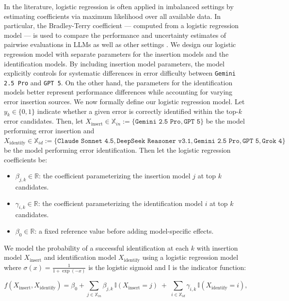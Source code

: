 \documentclass{article}
\newcommand{\gemini}{\texttt{Gemini 2.5 Pro}}
\newcommand{\gpt}{\texttt{GPT 5}}
\newcommand{\grok}{\texttt{Grok 4}}
\newcommand{\deepseek}{\texttt{DeepSeek Reasoner v3.1}}
\newcommand{\claude}{\texttt{Claude Sonnet 4.5}}
\begin{document}
In the literature, logistic regression is often applied in imbalanced settings by estimating coefficients via maximum likelihood over all available data. In particular, the Bradley-Terry coefficient \citep{bradley1952} --- computed from a logistic regression model --- is used to compare the performance and uncertainty estimates of pairwise evaluations in LLMs as well as other settings \citep{chiang2024chatbot, frick2025}. We design our logistic regression model with separate parameters for the insertion models and the identification models. By including insertion model parameters, the model explicitly controls for systematic differences in error difficulty between \gemini{} and \gpt{}. On the other hand, the parameters for the identification models better represent performance differences while accounting for varying error insertion sources. We now formally define our logistic regression model. Let $y_k \in \{0,1\}$ indicate whether a given error is correctly identified within the top-$k$ error candidates. Then, let $X_{\text{insert}} \in \mathbb{X}_{in} := \{\gemini{}, \gpt{}\}$ be the model performing error insertion and $X_{\text{identify}} \in \mathbb{X}_{id} :=\{\claude{}, \deepseek{}, \gemini{}, \gpt{}, \grok{}\}$ be the model performing error identification. Then let the logistic regression coefficients be:
\begin{itemize}
    \item $\beta_{j,k} \in \mathbb{R}$: the coefficient parameterizing the insertion model $j$ at top $k$ candidates.
    \item $\gamma_{i,k} \in \mathbb{R}$: the coefficient parameterizing the identification model $i$ at top $k$ candidates.
    \item $\beta_0 \in \mathbb{R}$: a fixed reference value before adding model-specific effects.
\end{itemize}

We model the probability of a successful identification at each $k$ with insertion model $X_{\text{insert}}$ and identification model $X_{\text{identify}}$ using a logistic regression model where $\sigma(x)=\frac{1}{1+\exp(-x)}$ is the logistic sigmoid and $\mathbb{I}$ is the indicator function:

\begin{equation*}
    f(X_{\text{insert}}, X_{\text{identify}})=\beta_0 + \sum_{j\in{\mathbb{X}_{in}}} \beta_{j,k}\,\mathbb{I}(X_{\text{insert}} = j)
\;+\;
\sum_{i\in{\mathbb{X}_{id}}} \gamma_{i,k}\,\mathbb{I}(X_{\text{identify}} = i),
\end{equation*}
\end{document}
